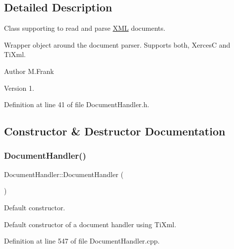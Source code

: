 \subsection{Detailed Description}
Class supporting to read and parse \hyperlink{namespace_d_d4hep_1_1_x_m_l}{X\+ML} documents. 

Wrapper object around the document parser. Supports both, XercesC and Ti\+Xml.

\begin{DoxyAuthor}{Author}
M.\+Frank 
\end{DoxyAuthor}
\begin{DoxyVersion}{Version}
1. 
\end{DoxyVersion}


Definition at line 41 of file Document\+Handler.\+h.



\subsection{Constructor \& Destructor Documentation}
\hypertarget{class_d_d4hep_1_1_x_m_l_1_1_document_handler_ac24bb98e06d7db2b0823816eec2f6c19}{}\label{class_d_d4hep_1_1_x_m_l_1_1_document_handler_ac24bb98e06d7db2b0823816eec2f6c19} 
\subsubsection{\texorpdfstring{Document\+Handler()}{DocumentHandler()}}
{\footnotesize\ttfamily Document\+Handler\+::\+Document\+Handler (\begin{DoxyParamCaption}{ }\end{DoxyParamCaption})}



Default constructor. 

Default constructor of a document handler using Ti\+Xml. 

Definition at line 547 of file Document\+Handler.\+cpp.

\hypertarget{class_d_d4hep_1_1_x_m_l_1_1_document_handler_ac4952ef609acf7234615d2db783ca5fa}{}\label{class_d_d4hep_1_1_x_m_l_1_1_document_handler_ac4952ef609acf7234615d2db783ca5fa} 
